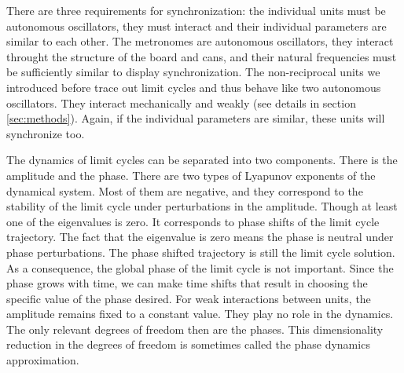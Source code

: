 \documentclass[11pt, a4paper]{article} %
\begin{document}
There are three requirements for synchronization: the individual units must be autonomous oscillators, they must interact and their
individual parameters are similar to each other. The metronomes are autonomous oscillators, 
they interact throught the structure of the board and cans, and their natural frequencies must be sufficiently similar 
to display synchronization. 
The non-reciprocal units we introduced before trace out limit cycles and thus behave like two autonomous oscillators. 
They interact mechanically and weakly (see details in section \ref{sec:methods}). 
Again, if the individual parameters are similar, these units will synchronize too. 

The dynamics of limit cycles can be separated into two components. There is the amplitude and the phase. 
There are two types of Lyapunov exponents %
of the dynamical system. Most of them are negative, and they 
correspond to the stability of the limit cycle under perturbations in the amplitude. Though at least one of the eigenvalues 
is zero. It corresponds to phase shifts of the limit cycle trajectory. The fact that the eigenvalue is zero means the 
phase is neutral under phase perturbations. The phase shifted trajectory is still the limit cycle solution. As a consequence, 
the global phase of the limit cycle is not important. %
Since the phase grows with time, we can make time shifts that result in choosing the specific value of the phase desired. 
For weak interactions between units, the amplitude 
remains fixed to a constant value. They play no role in the dynamics. The only relevant degrees of freedom then are the phases. 
This dimensionality reduction in the degrees of freedom is sometimes called the phase dynamics approximation. 
\end{document}
